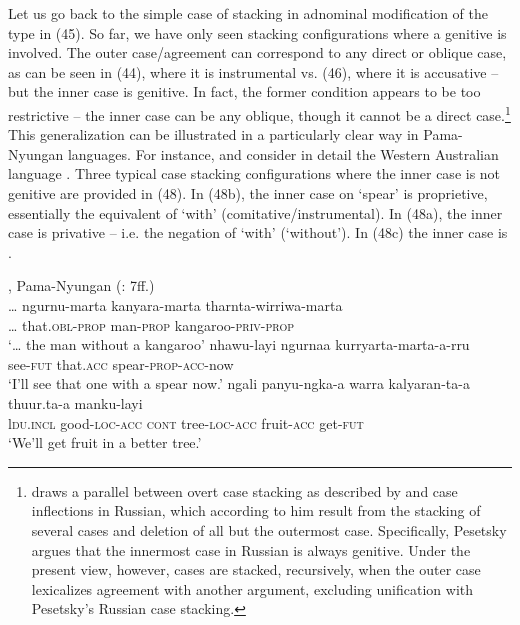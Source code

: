 \documentclass[output=paper]{langsci/langscibook}
\begin{document}
Let us go back to the simple case of stacking in adnominal modification of the type in (45). So far, we have only seen stacking configurations where a genitive is involved. The outer case\slash agreement can correspond to any direct or oblique case, as can be seen in (44), where it is instrumental vs. (46), where it is accusative – but the inner case is genitive. In fact, the former condition appears to be too restrictive – the inner case can be any oblique, though it cannot be a direct case.\footnote{\citet{Pesetsky2013} draws a parallel between overt case stacking as described by \citet{Richards2013} and case inflections in Russian, which according to him result from the stacking of several cases and deletion of all but the outermost case. Specifically, Pesetsky argues that the innermost case in Russian is always genitive. Under the present view, however, cases are stacked, recursively, when the outer case lexicalizes agreement with another argument, excluding unification with Pesetsky’s Russian case stacking.}  This generalization can be illustrated in a particularly clear way in Pama-Nyungan languages. For instance, \citet{Dench1988} and \citet{Dench1995} consider in detail the Western Australian language . Three typical case stacking configurations where the inner case is not genitive are provided in (48). In (48b), the inner case on ‘spear’ is proprietive, essentially the equivalent of  ‘with’ (comitative\slash instrumental). In (48a), the inner case is privative – i.e. the negation of ‘with’ (‘without’). In (48c) the inner case is .\largerpage[-2]

\ea%
    , Pama-Nyungan (\citealt{Dench1988}: 7ff.)\label{ex:manzini:48}\\
    \ea
    \gll … ngurnu-marta   kanyara-marta  tharnta-wirriwa-marta    \\
         … that.\textsc{obl-prop}   man-\textsc{prop}   kangaroo-\textsc{priv-prop}\\
    \glt ‘… the man without a kangaroo’
    \ex  
    \gll  nhawu-layi   ngurnaa  kurryarta-marta-a-rru    \\
         see-\textsc{fut}   that.\textsc{acc}   spear-\textsc{prop-acc}{}-now\\
    \glt ‘I'll see that one with a spear now.’
    \ex  
    \gll ngali   panyu-ngka-a   warra  kalyaran-ta-a   thuur.ta-a   manku-layi\\
         l\textsc{du.incl}   good-\textsc{loc-acc}  \textsc{cont}   tree-\textsc{loc-acc}   fruit-\textsc{acc}   get-\textsc{fut}\\
    \glt ‘We'll get fruit in a better tree.’ 
    \z
\z 
\end{document}
